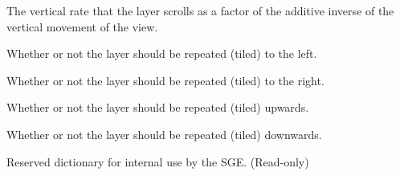 \documentclass[letterpaper,10pt,english]{sphinxmanual}
\begin{document}
\begin{fulllineitems}
\begin{fulllineitems}
\end{fulllineitems}


\begin{fulllineitems}
\label{gfx:sge.gfx.BackgroundLayer.yscroll_rate}
The vertical rate that the layer scrolls as a factor of the
additive inverse of the vertical movement of the view.

\end{fulllineitems}


\begin{fulllineitems}
\label{gfx:sge.gfx.BackgroundLayer.repeat_left}
Whether or not the layer should be repeated (tiled) to the left.

\end{fulllineitems}


\begin{fulllineitems}
\label{gfx:sge.gfx.BackgroundLayer.repeat_right}
Whether or not the layer should be repeated (tiled) to the right.

\end{fulllineitems}


\begin{fulllineitems}
\label{gfx:sge.gfx.BackgroundLayer.repeat_up}
Whether or not the layer should be repeated (tiled) upwards.

\end{fulllineitems}


\begin{fulllineitems}
\label{gfx:sge.gfx.BackgroundLayer.repeat_down}
Whether or not the layer should be repeated (tiled) downwards.

\end{fulllineitems}


\begin{fulllineitems}
\label{gfx:sge.gfx.BackgroundLayer.rd}
Reserved dictionary for internal use by the SGE.  (Read-only)

\end{fulllineitems}


\end{fulllineitems}
\end{document}
